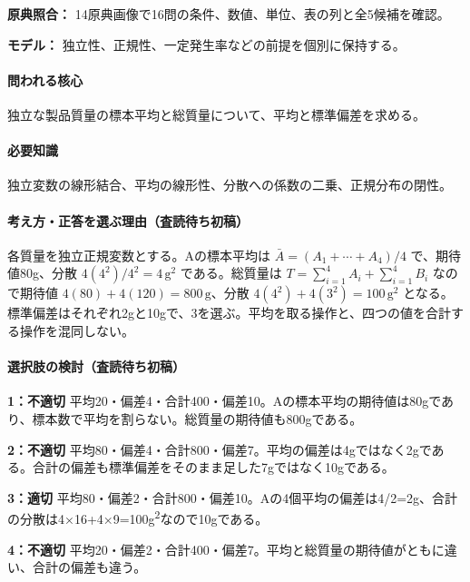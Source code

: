 \noindent\textbf{原典照合：} 14原典画像で16問の条件、数値、単位、表の列と全5候補を確認。\par

\noindent\textbf{モデル：} 独立性、正規性、一定発生率などの前提を個別に保持する。\par

\paragraph{問われる核心} 独立な製品質量の標本平均と総質量について、平均と標準偏差を求める。

\paragraph{必要知識} 独立変数の線形結合、平均の線形性、分散への係数の二乗、正規分布の閉性。

\paragraph{考え方・正答を選ぶ理由（査読待ち初稿）} 各質量を独立正規変数とする。Aの標本平均は \(\bar A=(A_1+\cdots+A_4)/4\) で、期待値80g、分散 \(4(4^2)/4^2=4\,\mathrm{g^2}\) である。総質量は \(T=\sum_{i=1}^4A_i+\sum_{i=1}^4B_i\) なので期待値 \(4(80)+4(120)=800\,\mathrm g\)、分散 \(4(4^2)+4(3^2)=100\,\mathrm{g^2}\) となる。標準偏差はそれぞれ2gと10gで、3を選ぶ。平均を取る操作と、四つの値を合計する操作を混同しない。

\paragraph{選択肢の検討（査読待ち初稿）}\mbox{}\par

\noindent\textbf{1：不適切} 平均20・偏差4・合計400・偏差10。Aの標本平均の期待値は80gであり、標本数で平均を割らない。総質量の期待値も800gである。\par

\noindent\textbf{2：不適切} 平均80・偏差4・合計800・偏差7。平均の偏差は4gではなく2gである。合計の偏差も標準偏差をそのまま足した7gではなく10gである。\par

\noindent\textbf{3：適切} 平均80・偏差2・合計800・偏差10。Aの4個平均の偏差は4/2=\allowbreak{}2g、合計の分散は4×16+4×9=\allowbreak{}100g\textsuperscript{2}なので10gである。\par

\noindent\textbf{4：不適切} 平均20・偏差2・合計400・偏差7。平均と総質量の期待値がともに違い、合計の偏差も違う。\par

